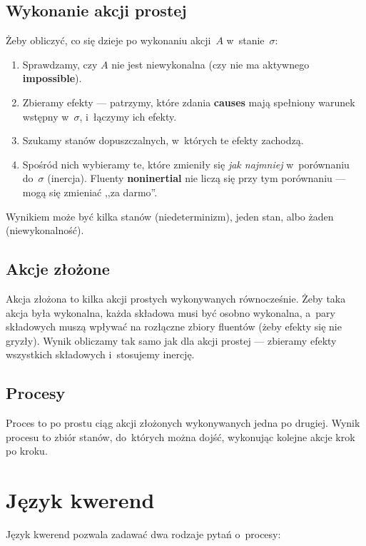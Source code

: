 \documentclass[11pt,a4paper]{article}
\newcommand{\causes}{\textbf{causes}}
\newcommand{\impossible}{\textbf{impossible}}
\newcommand{\noninertial}{\textbf{noninertial}}
\begin{document}
\subsection*{Wykonanie akcji prostej}
Żeby obliczyć, co się dzieje po wykonaniu akcji~$A$ w~stanie~$\sigma$:
\begin{enumerate}
  \item Sprawdzamy, czy $A$ nie jest niewykonalna (czy nie ma aktywnego \impossible{}).
  \item Zbieramy efekty --- patrzymy, które zdania \causes{} mają spełniony warunek
        wstępny w~$\sigma$, i~łączymy ich efekty.
  \item Szukamy stanów dopuszczalnych, w~których te efekty zachodzą.
  \item Spośród nich wybieramy te, które zmieniły się \emph{jak najmniej}
        w~porównaniu do~$\sigma$ (inercja). Fluenty \noninertial{} nie liczą się
        przy tym porównaniu --- mogą się zmieniać ,,za darmo''.
\end{enumerate}
Wynikiem może być kilka stanów (niedeterminizm), jeden stan, albo żaden (niewykonalność).

\subsection*{Akcje złożone}
Akcja złożona to kilka akcji prostych wykonywanych równocześnie.
Żeby taka akcja była wykonalna, każda składowa musi być osobno wykonalna,
a~pary składowych muszą wpływać na rozłączne zbiory fluentów
(żeby efekty się nie gryzły). Wynik obliczamy tak samo jak dla akcji prostej
--- zbieramy efekty wszystkich składowych i~stosujemy inercję.

\subsection*{Procesy}
Proces to po prostu ciąg akcji złożonych wykonywanych jedna po drugiej.
Wynik procesu to zbiór stanów, do~których można dojść, wykonując kolejne
akcje krok po kroku.

\section{Język kwerend}

Język kwerend pozwala zadawać dwa rodzaje pytań o~procesy:
\end{document}
